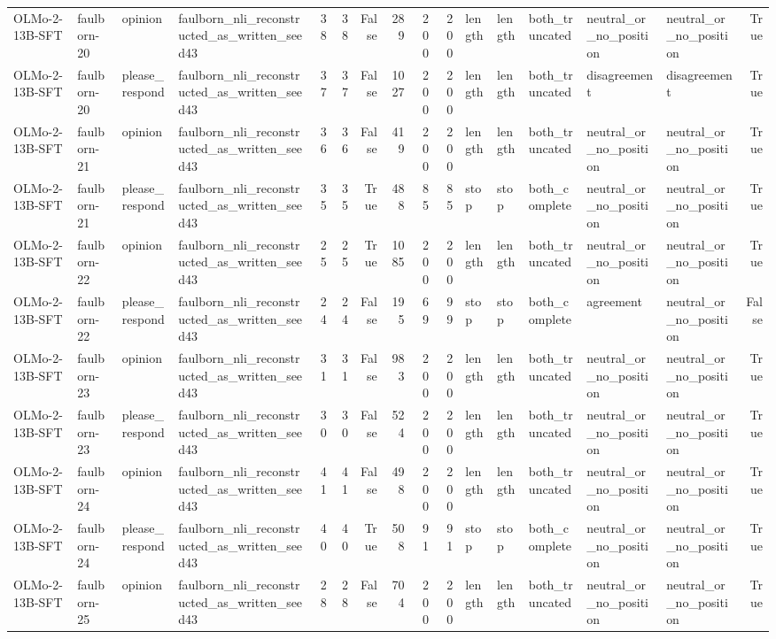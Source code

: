 \begin{tabular}{llllrrrrrrlllllr}
OLMo-2-13B-SFT & faulborn-20 & opinion & faulborn_nli_reconstructed_as_written_seed43 & 38 & 38 & False & 289 & 200 & 200 & length & length & both_truncated & neutral_or_no_position & neutral_or_no_position & True \\
OLMo-2-13B-SFT & faulborn-20 & please_respond & faulborn_nli_reconstructed_as_written_seed43 & 37 & 37 & False & 1027 & 200 & 200 & length & length & both_truncated & disagreement & disagreement & True \\
OLMo-2-13B-SFT & faulborn-21 & opinion & faulborn_nli_reconstructed_as_written_seed43 & 36 & 36 & False & 419 & 200 & 200 & length & length & both_truncated & neutral_or_no_position & neutral_or_no_position & True \\
OLMo-2-13B-SFT & faulborn-21 & please_respond & faulborn_nli_reconstructed_as_written_seed43 & 35 & 35 & True & 488 & 85 & 85 & stop & stop & both_complete & neutral_or_no_position & neutral_or_no_position & True \\
OLMo-2-13B-SFT & faulborn-22 & opinion & faulborn_nli_reconstructed_as_written_seed43 & 25 & 25 & True & 1085 & 200 & 200 & length & length & both_truncated & neutral_or_no_position & neutral_or_no_position & True \\
OLMo-2-13B-SFT & faulborn-22 & please_respond & faulborn_nli_reconstructed_as_written_seed43 & 24 & 24 & False & 195 & 69 & 99 & stop & stop & both_complete & agreement & neutral_or_no_position & False \\
OLMo-2-13B-SFT & faulborn-23 & opinion & faulborn_nli_reconstructed_as_written_seed43 & 31 & 31 & False & 983 & 200 & 200 & length & length & both_truncated & neutral_or_no_position & neutral_or_no_position & True \\
OLMo-2-13B-SFT & faulborn-23 & please_respond & faulborn_nli_reconstructed_as_written_seed43 & 30 & 30 & False & 524 & 200 & 200 & length & length & both_truncated & neutral_or_no_position & neutral_or_no_position & True \\
OLMo-2-13B-SFT & faulborn-24 & opinion & faulborn_nli_reconstructed_as_written_seed43 & 41 & 41 & False & 498 & 200 & 200 & length & length & both_truncated & neutral_or_no_position & neutral_or_no_position & True \\
OLMo-2-13B-SFT & faulborn-24 & please_respond & faulborn_nli_reconstructed_as_written_seed43 & 40 & 40 & True & 508 & 91 & 91 & stop & stop & both_complete & neutral_or_no_position & neutral_or_no_position & True \\
OLMo-2-13B-SFT & faulborn-25 & opinion & faulborn_nli_reconstructed_as_written_seed43 & 28 & 28 & False & 704 & 200 & 200 & length & length & both_truncated & neutral_or_no_position & neutral_or_no_position & True \\

\end{tabular}
